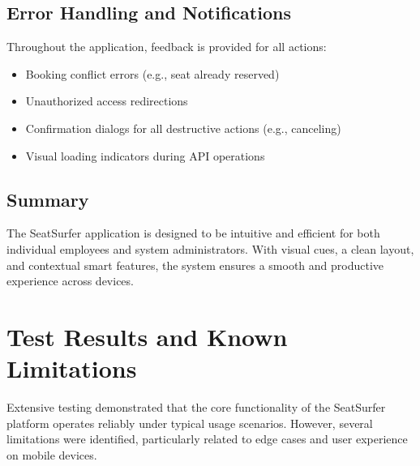 \documentclass[12pt,a4paper]{report} %
\begin{document}
\subsection{Error Handling and Notifications}

Throughout the application, feedback is provided for all actions:
\begin{itemize}
    \item Booking conflict errors (e.g., seat already reserved)
    \item Unauthorized access redirections
    \item Confirmation dialogs for all destructive actions (e.g., canceling)
    \item Visual loading indicators during API operations
\end{itemize}

\subsection{Summary}

The SeatSurfer application is designed to be intuitive and efficient for both individual employees and system administrators. With visual cues, a clean layout, and contextual smart features, the system ensures a smooth and productive experience across devices.

\section{Test Results and Known Limitations}

Extensive testing demonstrated that the core functionality of the SeatSurfer platform operates reliably under typical usage scenarios. However, several limitations were identified, particularly related to edge cases and user experience on mobile devices.
\end{document}

